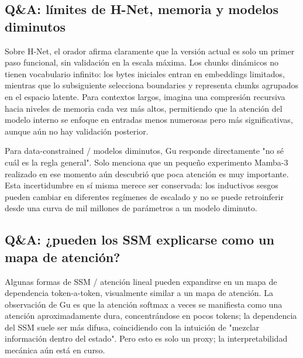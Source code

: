 \subsection{Q\&A: límites de H-Net, memoria y modelos diminutos}

Sobre H-Net, el orador afirma claramente que la versión actual es solo un primer paso funcional, sin validación en la escala máxima. Los chunks dinámicos no tienen vocabulario infinito: los bytes iniciales entran en embeddings limitados, mientras que lo subsiguiente selecciona boundaries y representa chunks agrupados en el espacio latente. Para contextos largos, imagina una compresión recursiva hacia niveles de memoria cada vez más altos, permitiendo que la atención del modelo interno se enfoque en entradas menos numerosas pero más significativas, aunque aún no hay validación posterior.


Para data-constrained / modelos diminutos, Gu responde directamente "no sé cuál es la regla general". Solo menciona que un pequeño experimento Mamba-3 realizado en ese momento aún descubrió que poca atención es muy importante. Esta incertidumbre en sí misma merece ser conservada: los inductivos sesgos pueden cambiar en diferentes regímenes de escalado y no se puede retroinferir desde una curva de mil millones de parámetros a un modelo diminuto.

\subsection{Q\&A: ¿pueden los SSM explicarse como un mapa de atención?}

Algunas formas de SSM / atención lineal pueden expandirse en un mapa de dependencia token-a-token, visualmente similar a un mapa de atención. La observación de Gu es que la atención softmax a veces se manifiesta como una atención aproximadamente dura, concentrándose en pocos tokens; la dependencia del SSM suele ser más difusa, coincidiendo con la intuición de "mezclar información dentro del estado". Pero esto es solo un proxy; la interpretabilidad mecánica aún está en curso.


